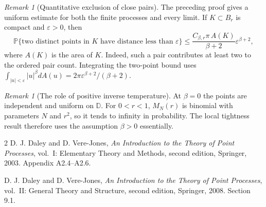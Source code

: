 \documentclass[11pt,a4paper]{article}
\numberwithin{equation}{section}
\theoremstyle{remark}
\newtheorem{remark}[theorem]{Remark}
\newcommand{\D}{\mathbb D}
\newcommand{\Prob}{\mathbb P}
\begin{document}
\begin{remark}[Quantitative exclusion of close pairs]
The preceding proof gives a uniform estimate for both the finite
processes and every limit. If $K\subset B_r$ is compact and
$\varepsilon>0$, then
\[
 \Prob\{\text{two distinct points in }K
                    \text{ have distance less than }\varepsilon\}
 \le \frac{C_{\beta,r}\pi\,A(K)}{\beta+2}
               \varepsilon^{\beta+2},
\]
where $A(K)$ is the area of $K$. Indeed, such a pair contributes at
least two to the ordered pair count. Integrating the two-point bound
uses
$\int_{|u|<\varepsilon}|u|^\beta dA(u)
 =2\pi\varepsilon^{\beta+2}/(\beta+2)$.
\end{remark}

\begin{remark}[The role of positive inverse temperature]
At $\beta=0$ the points are independent and uniform on $\D$.
For $0<r<1$, $M_N(r)$ is binomial with parameters $N$ and $r^2$,
so it tends to infinity in probability. The local tightness result
therefore uses the assumption $\beta>0$ essentially.
\end{remark}

\begin{thebibliography}{2}
D. J. Daley and D. Vere-Jones,
\emph{An Introduction to the Theory of Point Processes},
vol.~I: Elementary Theory and Methods, second edition, Springer, 2003.
Appendix A2.4--A2.6.

D. J. Daley and D. Vere-Jones,
\emph{An Introduction to the Theory of Point Processes},
vol.~II: General Theory and Structure, second edition, Springer, 2008.
Section 9.1.
\end{thebibliography}
\end{document}
